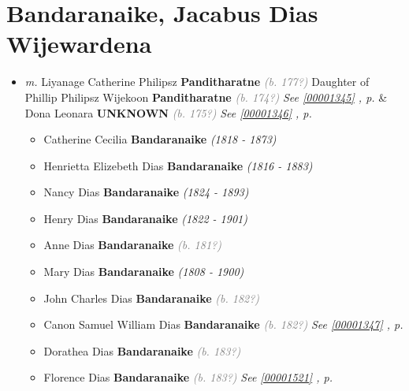 \documentclass[10pt, openany]{book}
\begin{document}
\chapter{Bandaranaike, Jacabus Dias Wijewardena}
\label{00001343}
\textcolor{slmaroon}{\textit{}}
\begin{itemize}
\item{\textit{m.} Liyanage Catherine Philipsz \textbf{Panditharatne} \textcolor{gray}{\textit{(b. 177?)}} Daughter of  Phillip Philipsz Wijekoon \textbf{Panditharatne} \textcolor{gray}{\textit{(b. 174?)}} \textcolor{slteal}{\textit{See  \autoref{00001345} \textit{, p. \pageref{00001345} }}}  \&  Dona Leonara \textbf{UNKNOWN} \textcolor{gray}{\textit{(b. 175?)}} \textcolor{slteal}{\textit{See  \autoref{00001346} \textit{, p. \pageref{00001346} }}}   \label{couple:00001343:00001344} \begin{itemize}
\item{Catherine Cecilia \textbf{Bandaranaike} \textcolor{slorange}{\textit{(1818 - 1873)}}
  }
\item{Henrietta Elizebeth Dias \textbf{Bandaranaike} \textcolor{slorange}{\textit{(1816 - 1883)}}
   }
\item{Nancy Dias \textbf{Bandaranaike} \textcolor{slorange}{\textit{(1824 - 1893)}}
  }
\item{Henry Dias  \textbf{Bandaranaike} \textcolor{slorange}{\textit{(1822 - 1901)}}
   }
\item{Anne Dias \textbf{Bandaranaike} \textcolor{gray}{\textit{(b. 181?)}}
  }
\item{Mary Dias \textbf{Bandaranaike} \textcolor{slorange}{\textit{(1808 - 1900)}}
  }
\item{John Charles Dias \textbf{Bandaranaike} \textcolor{gray}{\textit{(b. 182?)}}
   }
\item{Canon Samuel William Dias \textbf{Bandaranaike} \textcolor{gray}{\textit{(b. 182?)}} \textcolor{slteal}{\textit{See  \autoref{00001347} \textit{, p. \pageref{00001347} }}}}
\item{Dorathea Dias \textbf{Bandaranaike} \textcolor{gray}{\textit{(b. 183?)}}
  }
\item{Florence Dias \textbf{Bandaranaike} \textcolor{gray}{\textit{(b. 183?)}} \textcolor{slteal}{\textit{See  \autoref{00001521} \textit{, p. \pageref{00001521} }}}}
\end{itemize}}
\end{itemize}
   
\end{document}
